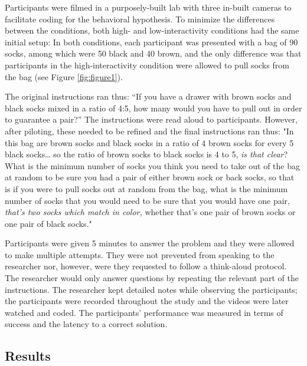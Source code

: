 \documentclass[twocolumn, issue, empirical, authordate,drafn]{jote-new-article}
\begin{document}
Participants were filmed in a purposely-built lab with three in-built cameras to facilitate coding for the behavioral hypothesis. To minimize the differences between the conditions, both high- and low-interactivity conditions had the same initial setup: In both conditions, each participant was presented with a bag of 90 socks, among which were 50 black and 40 brown, and the only difference was that participants in the high-interactivity condition were allowed to pull socks from the bag (see Figure \ref{fig:figure1}). 




The original instructions ran thus: ``If you have a drawer with brown socks and black socks mixed in a ratio of 4:5, how many would you have to pull out in order to guarantee a pair?'' The instructions were read aloud to participants. However, after piloting, these needed to be refined and the final instructions ran thus: "In this bag are brown socks and black socks in a ratio of 4 brown socks for every 5 black socks\ldots{} so the ratio of brown socks to black socks is 4 to 5, \emph{is that clear}? What is the minimum number of socks you think you need to take out of the bag at random to be sure you had a pair of either brown sock or back socks, so that is if you were to pull socks out at random from the bag, what is the minimum number of socks that you would need to be sure that you would have one pair, \emph{that's two socks which match in color,} whether that's one pair of brown socks or one pair of black socks."

Participants were given 5 minutes to answer the problem and they were allowed to make multiple attempts. They were not prevented from speaking to the researcher nor, however, were they requested to follow a think-aloud protocol. The researcher would only answer questions by repeating the relevant part of the instructions. The researcher kept detailed notes while observing the participants; the participants were recorded throughout the study and the videos were later watched and coded. The participants' performance was measured in terms of success and the latency to a correct solution. 


\subsection{Results}
\end{document}
